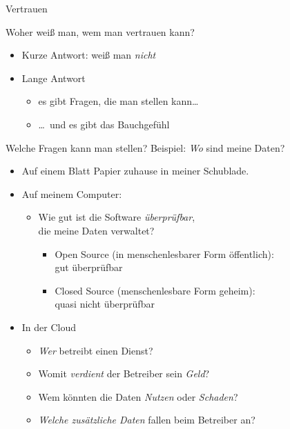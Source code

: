   \begin{frame}{Vertrauen}
    \begin{block}{Woher weiß man, wem man vertrauen kann?}
    \begin{itemize}
      \item Kurze Antwort: weiß man \emph{nicht}
      \item Lange Antwort
      \begin{itemize}
        \item es gibt Fragen, die man stellen kann\ldots
        \item \ldots\ und es gibt das Bauchgefühl
      \end{itemize}
    \end{itemize}
    \end{block}
  \end{frame}

  \begin{frame}{Welche Fragen kann man stellen?}
    Beispiel: \emph{Wo} sind meine Daten?
    \begin{itemize}
      \item Auf einem Blatt Papier zuhause in meiner Schublade.
      \item Auf meinem Computer:
      \begin{itemize}
        \item Wie gut ist die Software \emph{überprüfbar},\\ die meine Daten verwaltet?
        \begin{itemize}
          \item Open Source (in menschenlesbarer Form öffentlich):\\gut überprüfbar
          \item Closed Source (menschenlesbare Form geheim):\\quasi nicht überprüfbar
        \end{itemize}
      \end{itemize}
      \item In der Cloud
        \begin{itemize}
          \item \emph{Wer} betreibt einen Dienst?
          \item Womit \emph{verdient} der Betreiber sein \emph{Geld}?
          \item Wem könnten die Daten \emph{Nutzen} oder \emph{Schaden}?
          \item \emph{Welche zusätzliche Daten} fallen beim Betreiber an?
        \end{itemize}
    \end{itemize}
  \end{frame}

